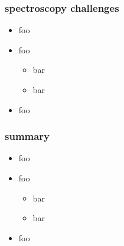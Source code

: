 \documentclass[pdftex]{beamer}
\begin{document}
\begin{frame}
  \frametitle{spectroscopy challenges}
  \begin{itemize}
  \item foo
  \item foo
    \begin{itemize}
    \item bar
    \item bar
    \end{itemize}
  \item foo
  \end{itemize}
\end{frame}

\begin{frame}
  \frametitle{summary}
  \begin{itemize}
  \item foo
  \item foo
    \begin{itemize}
    \item bar
    \item bar
    \end{itemize}
  \item foo
  \end{itemize}
\end{frame}
\end{document}
